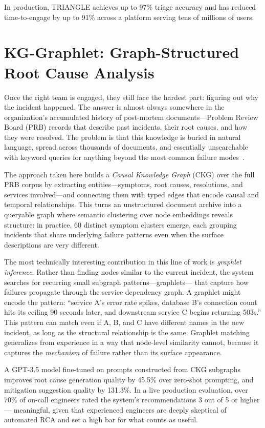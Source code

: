 \documentclass[conference]{IEEEtran}
\begin{document}
In production, TRIANGLE achieves up to 97\% triage accuracy and has reduced
time-to-engage by up to 91\% across a platform serving tens of millions of users.


\section{KG-Graphlet: Graph-Structured Root Cause Analysis}

Once the right team is engaged, they still face the hardest part: figuring out
why the incident happened. The answer is almost always somewhere in the
organization's accumulated history of post-mortem documents---Problem Review
Board (PRB) records that describe past incidents, their root causes, and how they
were resolved. The problem is that this knowledge is buried in natural language,
spread across thousands of documents, and essentially unsearchable with keyword
queries for anything beyond the most common failure modes~\cite{ckg}.

The approach taken here builds a \textit{Causal Knowledge Graph} (CKG) over the
full PRB corpus by extracting entities---symptoms, root causes, resolutions, and
services involved---and connecting them with typed edges that encode causal
and temporal relationships. This turns an unstructured document archive into a
queryable graph where semantic clustering over node embeddings reveals structure:
in practice, 60 distinct symptom clusters emerge, each grouping incidents that
share underlying failure patterns even when the surface descriptions are very different.

The most technically interesting contribution in this line of work is
\textit{graphlet inference}. Rather than finding nodes similar to the current
incident, the system searches for recurring small subgraph patterns---graphlets---
that capture how failures propagate through the service dependency graph.
A graphlet might encode the pattern: ``service A's error rate spikes, database B's
connection count hits its ceiling 90 seconds later, and downstream service C
begins returning 503s.'' This pattern can match even if A, B, and C have different
names in the new incident, as long as the structural relationship is the same.
Graphlet matching generalizes from experience in a way that node-level similarity
cannot, because it captures the \textit{mechanism} of failure rather than its
surface appearance.

A GPT-3.5 model fine-tuned on prompts constructed from CKG subgraphs improves
root cause generation quality by 45.5\% over zero-shot prompting, and mitigation
suggestion quality by 131.3\%. In a live production evaluation, over 70\% of
on-call engineers rated the system's recommendations 3 out of 5 or higher---
meaningful, given that experienced engineers are deeply skeptical of automated RCA
and set a high bar for what counts as useful.
\end{document}
